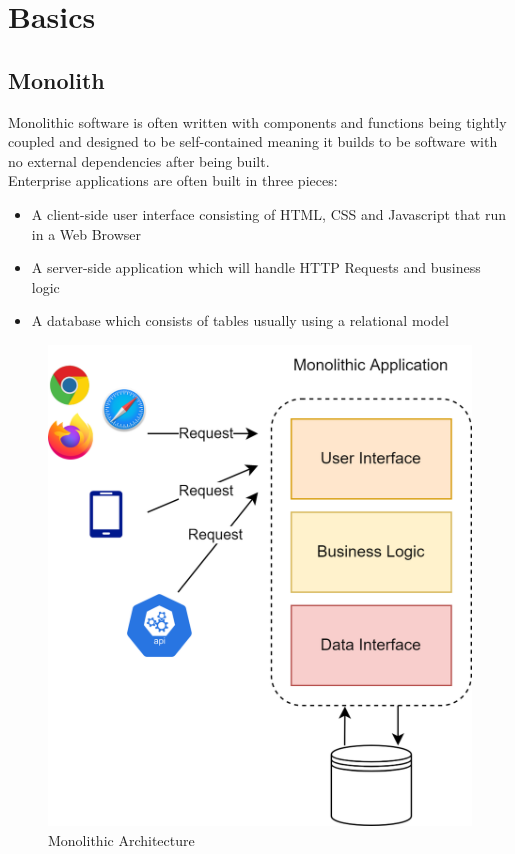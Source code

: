 \documentclass[MMR,Master,nenglish]{twbook}%
\begin{document}
\chapter{Basics}

\section{Monolith}
Monolithic software is often written with components and functions being tightly coupled and designed to be self-contained meaning it builds to be software with no external dependencies after being built.
\\
Enterprise applications are often built in three pieces:
\begin{itemize}
  \item A client-side user interface consisting of HTML, CSS and Javascript that run in a Web Browser
  \item A server-side application which will handle HTTP Requests and business logic
  \item A database which consists of tables usually using a relational model
\end{itemize}

\begin{figure} [H]
 \begin{center}
    \includegraphics[width=0.7\linewidth]{img/Monolith.png}
 \end{center}
 \caption{Monolithic Architecture}
 \label{monolith}
\end{figure}
\end{document}

